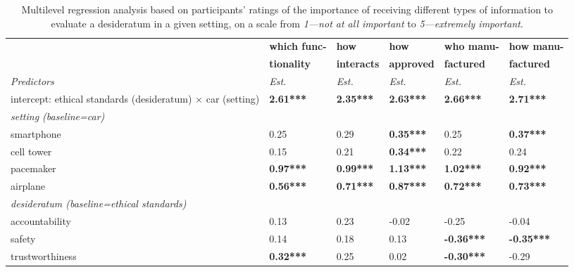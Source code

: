 \begin{table*}[htbp]
    \centering
    \footnotesize
    \caption{Multilevel regression analysis based on participants' ratings of the importance of receiving different types of information to evaluate a desideratum in a given setting, on a scale from \textit{1---not at all important} to \textit{5---extremely important}.}%
    \label{xhw_study::tab::regression_information}
    \begin{tabularx}{\textwidth}{XL{1.5cm}L{1.5cm}L{1.5cm}L{1.5cm}L{1.5cm}}
        \toprule
         & \textbf{which func-} & \textbf{how} & \textbf{how} & \textbf{who manu-} &  \textbf{how manu-} \\
         & \textbf{tionality} &  \textbf{interacts} & \textbf{approved}  & \textbf{factured}  & \textbf{factured}\\
         \textit{Predictors} & \textit{Est.} & \textit{Est.} & \textit{Est.} &  \textit{Est.} & \textit{Est.} \\
         \midrule
        intercept: ethical standards (desideratum) $\times$ car (setting) & \textbf{2.61***} & \textbf{2.35***} & \textbf{2.63***} & \textbf{2.66***}  & \textbf{2.71***} \\
        \midrule
         \textit{setting (baseline=car)} & & & & & \\
        smartphone & 0.25 %
        & 0.29
        & \textbf{0.35***} &  0.25 %
        & \textbf{0.37***} \\
        cell tower & 0.15 & 0.21 %
        & \textbf{0.34***} & 0.22 %
        & 0.24 
        \\
        pacemaker & \textbf{0.97***} & \textbf{0.99***} &  \textbf{1.13***} & \textbf{1.02***} & \textbf{0.92***} \\
        airplane & \textbf{0.56***} & \textbf{0.71***} &  \textbf{0.87***} & \textbf{0.72***} & \textbf{0.73***} \\
        \midrule
        \textit{desideratum (baseline=ethical standards)} & & & & & \\
        accountability & 0.13 & 0.23 %
        & -0.02 & -0.25 %
        & -0.04 \\
        safety & 0.14 & 0.18 %
        & 0.13 &  \textbf{-0.36***} & \textbf{-0.35***} \\
        trustworthiness & \textbf{0.32***} & 0.25 %
        & 0.02 & \textbf{-0.30***} & -0.29 %
        \\

\end{tabularx}
\end{table*}
